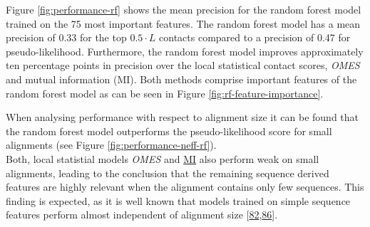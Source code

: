 \documentclass[11pt,a4paper,twoside]{book}
\theoremstyle{definition}
\theoremstyle{definition}
\theoremstyle{remark}
\begin{document}
Figure \ref{fig:performance-rf} shows the mean precision for the random
forest model trained on the 75 most important features. The random
forest model has a mean precision of 0.33 for the top \(0.5\cdot L\)
contacts compared to a precision of 0.47 for pseudo-likelihood.
Furthermore, the random forest model improves approximately ten
percentage points in precision over the local statistical contact
scores, \emph{OMES} and mutual information (MI). Both methods comprise
important features of the random forest model as can be seen in Figure
\ref{fig:rf-feature-importance}.

When analysing performance with respect to alignment size it can be
found that the random forest model outperforms the pseudo-likelihood
score for small alignments (see Figure \ref{fig:performance-neff-rf}).\\
Both, local statistial models \emph{OMES} and
\protect\hyperlink{abbrev}{MI} also perform weak on small alignments,
leading to the conclusion that the remaining sequence derived features
are highly relevant when the alignment contains only few sequences. This
finding is expected, as it is well known that models trained on simple
sequence features perform almost independent of alignment size
{[}\protect\hyperlink{ref-Skwark2016}{82},\protect\hyperlink{ref-Stahl2017}{86}{]}.
\end{document}
